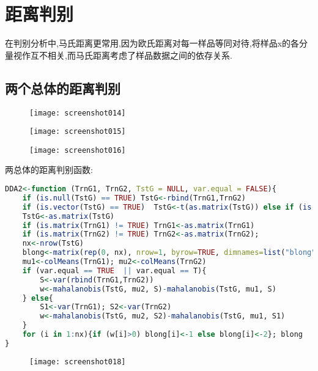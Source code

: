 \documentclass[11pt,a4paper,oneside]{book}
\begin{document}
\section{距离判别}
在判别分析中,马氏距离更常用,因为欧氏距离对每一样品等同对待,将样品x的各分量视作互不相关,而马氏距离考虑了样品数据之间的依存关系.
\subsection{两个总体的距离判别}
\begin{figure}[H]
	\centering
	\texttt{[image: screenshot014]}
\end{figure}
\begin{figure}[H]
	\centering
	\texttt{[image: screenshot015]}
\end{figure}
\begin{figure}[H]
	\centering
	\texttt{[image: screenshot016]}
\end{figure}

两总体的距离判别函数:
\begin{lstlisting}[language=r]
 DDA2<-function (TrnG1, TrnG2, TstG = NULL, var.equal = FALSE){
	if (is.null(TstG) == TRUE) TstG<-rbind(TrnG1,TrnG2)
	if (is.vector(TstG) == TRUE)  TstG<-t(as.matrix(TstG)) else if (is.matrix(TstG) != TRUE)
	TstG<-as.matrix(TstG)
	if (is.matrix(TrnG1) != TRUE) TrnG1<-as.matrix(TrnG1)
	if (is.matrix(TrnG2) != TRUE) TrnG2<-as.matrix(TrnG2); 
	nx<-nrow(TstG)
	blong<-matrix(rep(0, nx), nrow=1, byrow=TRUE, dimnames=list("blong", 1:nx))
	mu1<-colMeans(TrnG1); mu2<-colMeans(TrnG2) 
	if (var.equal == TRUE  || var.equal == T){
		S<-var(rbind(TrnG1,TrnG2))
		w<-mahalanobis(TstG, mu2, S)-mahalanobis(TstG, mu1, S)
	} else{
		S1<-var(TrnG1); S2<-var(TrnG2)
		w<-mahalanobis(TstG, mu2, S2)-mahalanobis(TstG, mu1, S1)
	}
	for (i in 1:nx){if (w[i]>0) blong[i]<-1 else blong[i]<-2}; blong
}

\end{lstlisting}
\begin{figure}[H]
	\centering
	\texttt{[image: screenshot018]}
\end{figure}
\end{document}
